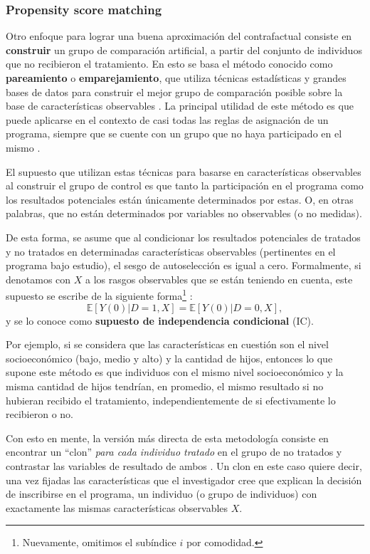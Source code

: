 \documentclass[../../main.tex]{subfiles}
\begin{document}
\subsubsection{Propensity score matching}
Otro enfoque para lograr una buena aproximación del contrafactual consiste en
\textbf{construir} un grupo de comparación artificial, a partir del conjunto de individuos
que no recibieron el tratamiento. En esto se basa el método conocido como
\textbf{pareamiento} o \textbf{emparejamiento}, que utiliza técnicas estadísticas y
grandes bases de datos para construir el mejor grupo de comparación posible sobre la base
de características observables \cite{gertler-2016}. La principal utilidad de este método
es que puede aplicarse en el contexto de casi todas las reglas de asignación de un
programa, siempre que se cuente con un grupo que no haya participado en el mismo
\cite{gertler-2016}.

El supuesto que utilizan estas técnicas para basarse en características observables al
construir el grupo de control es que tanto la participación en el programa como los
resultados potenciales están únicamente determinados por estas. O, en otras palabras, que
no están determinados por variables no observables (o no medidas).

De esta forma, se asume que al condicionar los resultados potenciales de tratados y no
tratados en determinadas características observables (pertinentes en el programa bajo
estudio), el sesgo de autoselección es igual a cero. Formalmente, si denotamos con \(X\) a
los rasgos observables que se están teniendo en cuenta, este supuesto se escribe de la
siguiente forma\footnote{Nuevamente, omitimos el subíndice \(i\) por comodidad.} :
\begin{equation}
    \mathbb{E}\left[Y(0)|D=1, X\right] = \mathbb{E}\left[Y(0)|D=0, X\right],
\end{equation}
y se lo conoce como \textbf{supuesto de independencia condicional} (IC).

Por ejemplo, si se considera que las características en cuestión son el nivel
socioeconómico (bajo, medio y alto) y la cantidad de hijos, entonces lo que supone este
método es que individuos con el mismo nivel socioeconómico y la misma cantidad de hijos
tendrían, en promedio, el mismo resultado si no hubieran recibido el tratamiento,
independientemente de si efectivamente lo recibieron o no.

Con esto en mente, la versión más directa de esta metodología consiste en encontrar un
``clon'' \textit{para cada individuo tratado} en el grupo de no tratados y contrastar las
variables de resultado de ambos \cite{bernal}. Un clon en este caso quiere decir, una vez
fijadas las características que el investigador cree que explican la decisión de
inscribirse en el programa, un individuo (o grupo de individuos) con exactamente las
mismas características observables \(X\).
\end{document}
